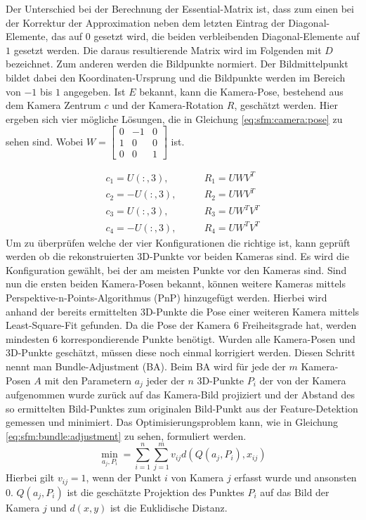 \documentclass[12pt,titlepage, twoside]{article}
\begin{document}
Der Unterschied bei der Berechnung der Essential-Matrix ist, dass zum einen bei der Korrektur der Approximation neben dem letzten Eintrag der Diagonal-Elemente, das auf $0$ gesetzt wird, 
die beiden verbleibenden Diagonal-Elemente auf $1$ gesetzt werden. Die daraus resultierende Matrix wird im Folgenden mit $D$ bezeichnet. Zum anderen werden die Bildpunkte normiert.
Der Bildmittelpunkt bildet dabei den Koordinaten-Ursprung und die Bildpunkte werden im Bereich von $-1$ bis $1$ angegeben.
Ist $E$ bekannt, kann die Kamera-Pose, bestehend aus dem Kamera Zentrum $c$ und der Kamera-Rotation $R$, geschätzt werden.
Hier ergeben sich vier mögliche Lösungen, die in Gleichung \ref{eq:sfm:camera:pose} zu sehen sind. Wobei $W=
\begin{bmatrix}
    0 & -1 & 0\\
    1 & 0 & 0\\
    0 & 0 & 1
\end{bmatrix}
$ ist.

\begin{equation}
    \label{eq:sfm:camera:pose}
    \begin{split}
    c_1=U(:,3),&\qquad R_1=UWV^T \\
    c_2=-U(:,3),&\qquad R_2=UWV^T \\
    c_3=U(:,3),&\qquad R_3=UW^TV^T \\
    c_4=-U(:,3),&\qquad R_4=UW^TV^T
    \end{split}
\end{equation}
Um zu überprüfen welche der vier Konfigurationen die richtige ist, kann geprüft werden ob die rekonstruierten 3D-Punkte vor beiden Kameras sind. Es wird die Konfiguration gewählt, bei der am meisten Punkte vor den Kameras sind.
Sind nun die ersten beiden Kamera-Posen bekannt, können weitere Kameras mittels Perspektive-n-Points-Algorithmus (PnP) hinzugefügt werden. 
Hierbei wird anhand der bereits ermittelten 3D-Punkte die Pose einer weiteren Kamera mittels Least-Square-Fit gefunden. Da die Pose der Kamera 6 Freiheitsgrade hat, werden mindesten 6 korrespondierende Punkte benötigt. 
Wurden alle Kamera-Posen und 3D-Punkte geschätzt, müssen diese noch einmal korrigiert werden. Diesen Schritt nennt man Bundle-Adjustment (BA).
Beim BA wird für jede der $m$ Kamera-Posen $A$ mit den Parametern $a_j$ jeder der $n$ 3D-Punkte $P_i$ der von der Kamera aufgenommen wurde zurück auf das Kamera-Bild projiziert und 
der Abstand des so ermittelten Bild-Punktes zum originalen Bild-Punkt aus der Feature-Detektion gemessen und minimiert. 
Das Optimisierungsproblem kann, wie in Gleichung \ref{eq:sfm:bundle:adjustment} zu sehen, formuliert werden. 
\begin{equation}
    \label{eq:sfm:bundle:adjustment}
    \min_{a_j, P_i} = \sum_{i=1}^n \sum_{j=1}^m v_{ij} d(Q(a_j, P_i), x_{ij})
\end{equation}
Hierbei gilt $v_{ij} = 1$, wenn der Punkt $i$ von Kamera $j$ erfasst wurde und ansonsten $0$.
$Q(a_j, P_i)$ ist die geschätzte Projektion des Punktes $P_i$ auf das Bild der Kamera $j$ und $d(x,y)$ ist die Euklidische Distanz.
\end{document}
